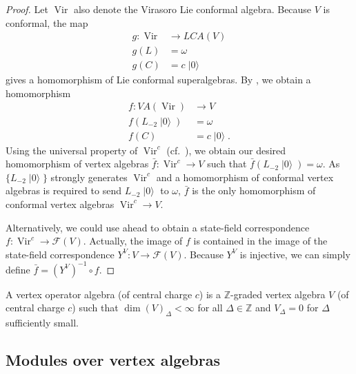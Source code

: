 \documentclass[a4paper, 12pt, reqno]{amsart}
\theoremstyle{remark}
\numberwithin{equation}{subsection}
\DeclareMathOperator{\Vir}{Vir}
\DeclareMathOperator{\vac}{|0\rangle}
\begin{document}
\begin{proof}
  Let $\Vir$ also denote the Virasoro Lie conformal algebra.
  Because $V$ is conformal, the map
  \begin{align*}
    g: \Vir &\to LCA(V) \\
    g(L) &= \omega \\
    g(C) &= c\vac
  \end{align*}
  gives a homomorphism of Lie conformal superalgebras.
  By , we obtain a homomorphism
  \begin{align*}
    f: VA(\Vir) &\to V \\
    f(L_{-2}\vac) &= \omega \\
    f(C) &= c\vac.
  \end{align*}
  Using the universal property of $\Vir^c$ (cf.\ ), we obtain our desired homomorphism of vertex algebras $\bar{f}: \Vir^c \to V$ such that $\bar{f}(L_{-2}\vac) = \omega$.
  As $\{L_{-2}\vac\}$ strongly generates $\Vir^c$ and a homomorphism of conformal vertex algebras is required to send $L_{-2}\vac$ to $\omega$, $\bar{f}$ is the only homomorphism of conformal vertex algebras $\Vir^c \to V$.
  
  Alternatively, we could use  ahead to obtain a state-field correspondence $f: \Vir^c \to \mathcal{F}(V)$.
  Actually, the image of $f$ is contained in the image of the state-field correspondence $Y^V: V \to \mathcal{F}(V)$.
  Because $Y^V$ is injective, we can simply define $\bar{f} = (Y^V)^{-1}\circ f$.
\end{proof}

A vertex operator algebra (of central charge $c$) is a $\mathbb{Z}$-graded vertex algebra $V$ (of central charge $c$) such that $\dim(V)_{\Delta} < \infty$ for all $\Delta \in \mathbb{Z}$ and $V_{\Delta} = 0$ for $\Delta$ sufficiently small.

\subsection{Modules over vertex algebras}
\label{sec:modules-over-vertex}
\end{document}
